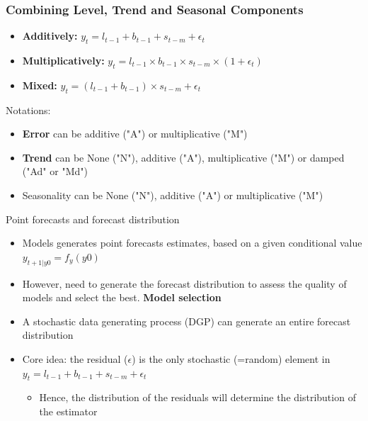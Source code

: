 \documentclass{beamer}
\begin{document}
\begin{frame}
  \frametitle{Combining Level, Trend and Seasonal Components}

  \begin{itemize}
  \item \textbf{Additively:} $y_t = l_{t-1} + b_{t-1} + s_{t-m} + \epsilon_t$
  \item \textbf{Multiplicatively:} $y_t = l_{t-1} \times b_{t-1} \times s_{t-m} \times (1 + \epsilon_t)$
  \item \textbf{Mixed:} $y_t = (l_{t-1} + b_{t-1}) \times s_{t-m} + \epsilon_t $  
  \end{itemize}

  Notations:
  \begin{itemize}
  \item \textbf{Error} can be additive ("A") or multiplicative ("M")
  \item \textbf{Trend} can be None ("N"), additive ("A"), multiplicative ("M") or damped ("Ad" or "Md")
  \item Seasonality can be None ("N"), additive ("A") or multiplicative ("M")
  \end{itemize}
    
\end{frame}


\begin{frame}{Point forecasts and forecast distribution}

  \begin{itemize}
  \item Models generates point forecasts estimates, based on a given conditional value $y_{t+1|y0} = f_y(y0)$ 
  \item However, need to generate the forecast distribution to assess the quality of models and select the best. \textbf{Model selection}
  \item A stochastic data generating process (DGP) can generate an entire forecast distribution
  \item Core idea: the residual ($\epsilon$) is the only stochastic (=random) element in $y_t = l_{t-1} + b_{t-1} + s_{t-m} + \epsilon_t$
    \begin{itemize}
    \item Hence, the distribution of the residuals will determine the distribution of the estimator
    \end{itemize}
  \end{itemize}


  
\end{frame}
\end{document}
